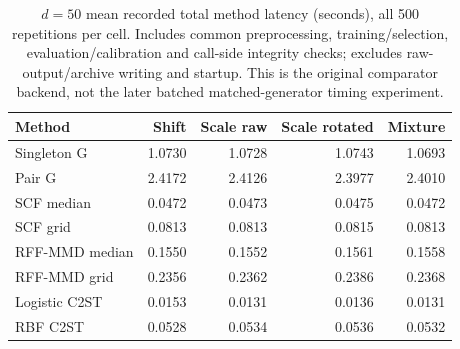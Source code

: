 {\color{blue}
\begin{table}[t]
\color{blue}
\centering
\small
\caption{$d=50$ mean recorded total method latency (seconds), all 500 repetitions per cell. Includes common preprocessing, training/selection, evaluation/calibration and call-side integrity checks; excludes raw-output/archive writing and startup. This is the original comparator backend, not the later batched matched-generator timing experiment.}
\label{tab:comparator-runtime-d50}
\setlength{\tabcolsep}{8pt}
\renewcommand{\arraystretch}{1.2}
\begin{tabular}{lrrrr}
\toprule
Method & Shift & Scale raw & Scale rotated & Mixture\\
\midrule
Singleton G & 1.0730 & 1.0728 & 1.0743 & 1.0693 \\
Pair G & 2.4172 & 2.4126 & 2.3977 & 2.4010 \\
SCF median & 0.0472 & 0.0473 & 0.0475 & 0.0472 \\
SCF grid & 0.0813 & 0.0813 & 0.0815 & 0.0813 \\
RFF-MMD median & 0.1550 & 0.1552 & 0.1561 & 0.1558 \\
RFF-MMD grid & 0.2356 & 0.2362 & 0.2386 & 0.2368 \\
Logistic C2ST & 0.0153 & 0.0131 & 0.0136 & 0.0131 \\
RBF C2ST & 0.0528 & 0.0534 & 0.0536 & 0.0532 \\
\bottomrule
\end{tabular}
\end{table}
}

